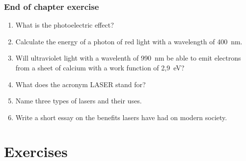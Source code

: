 \section{End of chapter exercise}
\begin{enumerate}
\item What is the photoelectric effect? 
\item Calculate the energy of a photon of red light with a wavelength of 400~nm.
\item Will ultraviolet light with a wavelenth of 990~nm be able to emit electrons from a sheet of calcium with a work function of 2,9~eV?
\item What does the acronym LASER stand for?
\item Name three types of lasers and their uses.
\item Write a short essay on the benefits lasers have had on modern society.
\end{enumerate}









\part{Exercises}
